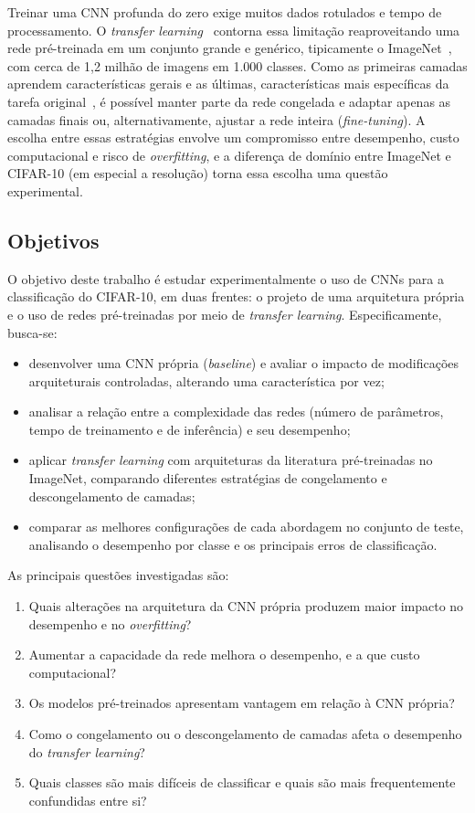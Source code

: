 Treinar uma CNN profunda do zero exige muitos dados rotulados e tempo de
processamento. O \textit{transfer learning}~\cite{pan2010survey} contorna essa
limitação reaproveitando uma rede pré-treinada em um conjunto grande e
genérico, tipicamente o ImageNet~\cite{deng2009imagenet}, com cerca de
1,2 milhão de imagens em 1.000 classes. Como as primeiras camadas aprendem
características gerais e as últimas, características mais específicas da tarefa
original~\cite{yosinski2014transferable}, é possível manter parte da rede
congelada e adaptar apenas as camadas finais ou, alternativamente, ajustar a
rede inteira (\textit{fine-tuning}). A escolha entre essas estratégias envolve
um compromisso entre desempenho, custo computacional e risco de
\textit{overfitting}, e a diferença de domínio entre ImageNet e CIFAR-10
(em especial a resolução) torna essa escolha uma questão experimental.

\subsection{Objetivos}

O objetivo deste trabalho é estudar experimentalmente o uso de CNNs para a
classificação do CIFAR-10, em duas frentes: o projeto de uma arquitetura
própria e o uso de redes pré-treinadas por meio de \textit{transfer learning}.
Especificamente, busca-se:

\begin{itemize}
  \item desenvolver uma CNN própria (\textit{baseline}) e avaliar o impacto de
        modificações arquiteturais controladas, alterando uma característica
        por vez;
  \item analisar a relação entre a complexidade das redes (número de
        parâmetros, tempo de treinamento e de inferência) e seu desempenho;
  \item aplicar \textit{transfer learning} com arquiteturas da literatura
        pré-treinadas no ImageNet, comparando diferentes estratégias de
        congelamento e descongelamento de camadas;
  \item comparar as melhores configurações de cada abordagem no conjunto de
        teste, analisando o desempenho por classe e os principais erros de
        classificação.
\end{itemize}

As principais questões investigadas são:
\begin{enumerate}
  \item Quais alterações na arquitetura da CNN própria produzem maior impacto
        no desempenho e no \textit{overfitting}?
  \item Aumentar a capacidade da rede melhora o desempenho, e a que custo
        computacional?
  \item Os modelos pré-treinados apresentam vantagem em relação à CNN própria?
  \item Como o congelamento ou o descongelamento de camadas afeta o desempenho
        do \textit{transfer learning}?
  \item Quais classes são mais difíceis de classificar e quais são mais
        frequentemente confundidas entre si?
\end{enumerate}


